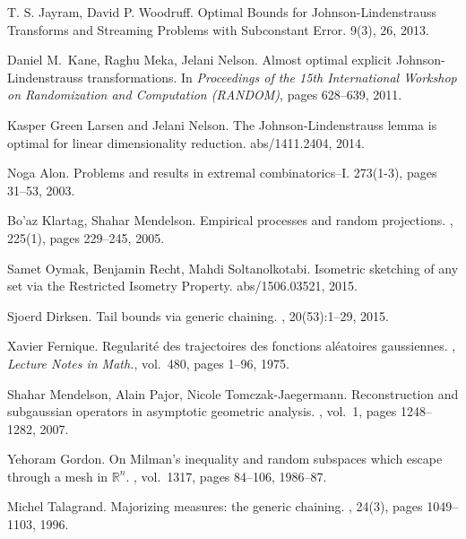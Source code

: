 \documentclass[11pt]{article}
\begin{document}
\begin{thebibliography}{42}


T. S. Jayram, David P. Woodruff.
\newblock Optimal Bounds for Johnson-Lindenstrauss Transforms and Streaming Problems with Subconstant Error.
 9(3), 26, 2013.

Daniel M.\ Kane, Raghu Meka, Jelani Nelson.
\newblock Almost optimal explicit Johnson-Lindenstrauss transformations.
\newblock In {\em Proceedings of the 15th International Workshop on Randomization and Computation (RANDOM)}, pages 628--639, 2011. 

Kasper Green Larsen and Jelani Nelson.
\newblock The Johnson-Lindenstrauss lemma is optimal for linear dimensionality reduction.
 abs/1411.2404, 2014.

Noga Alon.
\newblock Problems and results in extremal combinatorics--I.
 273(1-3), pages 31--53, 2003.


Bo'az Klartag, Shahar Mendelson.
\newblock Empirical processes and random projections.
, 225(1), pages 229--245, 2005.

Samet Oymak, Benjamin Recht, Mahdi Soltanolkotabi.
\newblock Isometric sketching of any set via the Restricted Isometry Property. 
 abs/1506.03521, 2015.

Sjoerd Dirksen.
\newblock Tail bounds via generic chaining.
, 20(53):1--29, 2015.

Xavier Fernique.
\newblock Regularit\'{e} des trajectoires des fonctions al\'{e}atoires gaussiennes.
, {\em Lecture Notes in Math.}, vol.\ 480, pages 1--96, 1975.

Shahar Mendelson, Alain Pajor, Nicole Tomczak-Jaegermann.
\newblock Reconstruction and subgaussian operators in asymptotic geometric analysis.
, vol.\ 1, pages 1248--1282, 2007.

Yehoram Gordon.
\newblock On Milman's inequality and random subspaces which escape through a mesh in $\mathbb{R}^n$.
, vol.\ 1317, pages 84--106, 1986--87.

Michel Talagrand.
\newblock Majorizing measures: the generic chaining.
, 24(3), pages 1049--1103, 1996.

\end{thebibliography}
\end{document}

